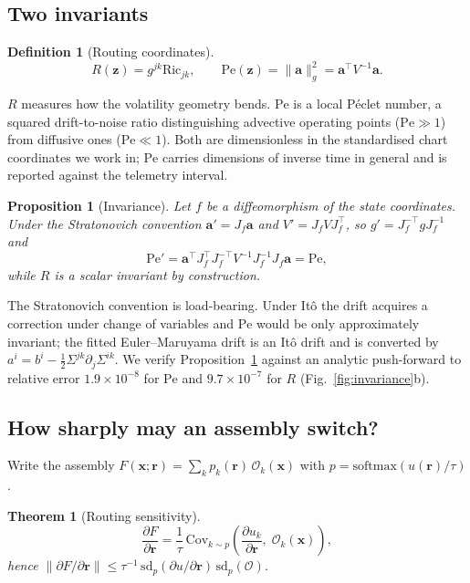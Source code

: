 \documentclass[11pt]{article}
\newtheorem{theorem}{Theorem}
\newtheorem{proposition}{Proposition}
\newtheorem{definition}{Definition}
\newcommand{\Pen}{\mathrm{Pe}}
\newcommand{\z}{\bm{z}}
\newcommand{\x}{\bm{x}}
\newcommand{\rr}{\bm{r}}
\begin{document}
\subsection{Two invariants}

\begin{definition}[Routing coordinates]
\label{def:coords}
\begin{equation}
  R(\z) = g^{jk}\mathrm{Ric}_{jk},
  \qquad
  \Pen(\z) = \|\bm{a}\|_g^2 = \bm{a}^{\!\top} V^{-1}\bm{a}.
\end{equation}
\end{definition}

$R$ measures how the volatility geometry bends. $\Pen$ is a local P\'eclet
number, a squared drift-to-noise ratio distinguishing advective operating
points ($\Pen\gg1$) from diffusive ones ($\Pen\ll1$). Both are dimensionless in
the standardised chart coordinates we work in; $\Pen$ carries dimensions of
inverse time in general and is reported against the telemetry interval.

\begin{proposition}[Invariance]
\label{prop:inv}
Let $f$ be a diffeomorphism of the state coordinates. Under the Stratonovich
convention $\bm{a}'=J_f\bm{a}$ and $V'=J_f V J_f^{\!\top}$, so
$g'=J_f^{-\top}gJ_f^{-1}$ and
\begin{equation}
  \Pen' = \bm{a}^{\!\top}J_f^{\!\top}J_f^{-\top}V^{-1}J_f^{-1}J_f\bm{a}=\Pen,
\end{equation}
while $R$ is a scalar invariant by construction.
\end{proposition}

The Stratonovich convention is load-bearing. Under It\^o the drift acquires a
correction under change of variables and $\Pen$ would be only approximately
invariant; the fitted Euler--Maruyama drift is an It\^o drift and is converted
by $a^i=b^i-\tfrac12\Sigma^{jk}\partial_j\Sigma^{ik}$. We verify
Proposition~\ref{prop:inv} against an analytic push-forward to relative error
$1.9\times10^{-8}$ for $\Pen$ and $9.7\times10^{-7}$ for $R$
(Fig.~\ref{fig:invariance}b).

\subsection{How sharply may an assembly switch?}

Write the assembly $F(\x;\rr)=\sum_k p_k(\rr)\,\mathcal{O}_k(\x)$ with
$p=\mathrm{softmax}(u(\rr)/\tau)$.

\begin{theorem}[Routing sensitivity]
\label{thm:sens}
\begin{equation}
  \frac{\partial F}{\partial \rr}
  = \frac{1}{\tau}\,
    \mathrm{Cov}_{k\sim p}\!\left(\frac{\partial u_k}{\partial \rr},\;
                                  \mathcal{O}_k(\x)\right),
  \label{eq:thm1}
\end{equation}
hence
$\|\partial F/\partial\rr\|\le
 \tau^{-1}\,\mathrm{sd}_p(\partial u/\partial\rr)\,\mathrm{sd}_p(\mathcal{O})$.
\end{theorem}
\end{document}

